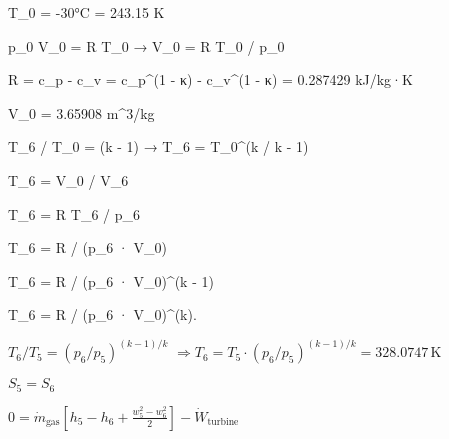 T_0 = -30°C = 243.15 K  

p_0 V_0 = R T_0 → V_0 = R T_0 / p_0  

R = c_p - c_v = c_p^(1 - κ) - c_v^(1 - κ) = 0.287429 kJ/kg·K  

V_0 = 3.65908 m^3/kg  

T_6 / T_0 = (k - 1) → T_6 = T_0^(k / k - 1)  

T_6 = V_0 / V_6  

T_6 = R T_6 / p_6  

T_6 = R / (p_6 · V_0)  

T_6 = R / (p_6 · V_0)^(k - 1)  

T_6 = R / (p_6 · V_0)^(k).

\( T_6 / T_5 = (p_6 / p_5)^{(k-1)/k} \)  
\( \Rightarrow T_6 = T_5 \cdot (p_6 / p_5)^{(k-1)/k} = 328.0747 \, \text{K} \)  

\( S_5 = S_6 \)  

\( 0 = \dot{m}_{\text{gas}} \left[ h_5 - h_6 + \frac{w_5^2 - w_6^2}{2} \right] - \dot{W}_{\text{turbine}} \)